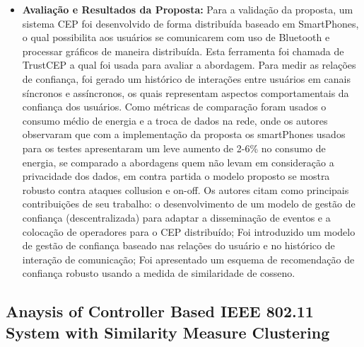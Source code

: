 \documentclass[tid,table]{texufpel} %
\begin{document}
\begin{itemize}
	
	\item \textbf{Avaliação e Resultados da Proposta:} Para a validação da proposta, um sistema CEP foi desenvolvido de forma distribuída baseado em SmartPhones, o qual possibilita aos usuários se comunicarem com uso de Bluetooth e processar gráficos de maneira distribuída. Esta ferramenta foi chamada de TrustCEP a qual foi usada para avaliar a abordagem. Para medir as relações de confiança, foi gerado um histórico de interações entre usuários em canais síncronos e assíncronos, os quais representam aspectos comportamentais da confiança dos usuários. Como métricas de comparação foram usados o consumo médio de energia e a troca de dados na rede, onde os autores observaram que com a implementação da proposta os smartPhones usados para os testes apresentaram um leve aumento de 2-6\% no consumo de energia, se comparado a abordagens quem não levam em consideração a privacidade dos dados, em contra partida o modelo proposto se mostra robusto contra ataques collusion e on-off.
	Os autores citam como principais contribuições de seu trabalho: o desenvolvimento de um modelo de gestão de confiança (descentralizada) para adaptar a disseminação de eventos e a colocação de operadores para o CEP distribuído; Foi introduzido um modelo de gestão de confiança baseado nas relações do usuário e no histórico de interação de comunicação; Foi apresentado um esquema de recomendação de confiança robusto usando a medida de similaridade de cosseno.
	
	
\end{itemize}

\subsection{Anaysis of Controller Based IEEE 802.11 System with Similarity Measure Clustering}
\end{document}
